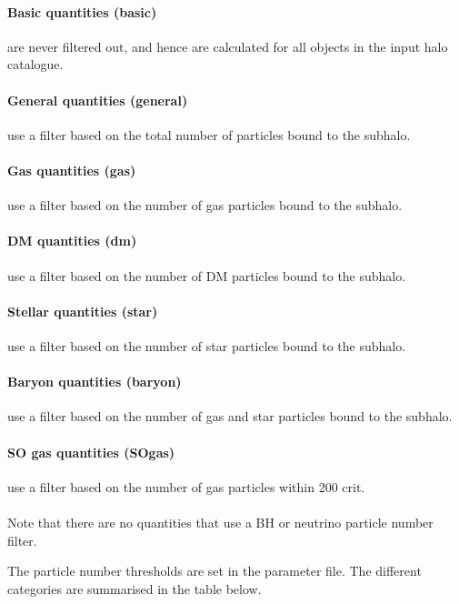 \documentclass{article}
\begin{document}
\paragraph{Basic quantities (basic)} are never filtered out, and hence are calculated for all objects in the
input halo catalogue.

\paragraph{General quantities (general)} use a filter based on the total number of particles bound to the 
subhalo.

\paragraph{Gas quantities (gas)} use a filter based on the number of gas particles bound to the subhalo. 

\paragraph{DM quantities (dm)} use a filter based on the number of DM particles bound to the subhalo.

\paragraph{Stellar quantities (star)} use a filter based on the number of star particles bound to the 
subhalo.

\paragraph{Baryon quantities (baryon)} use a filter based on the number of gas and star particles 
bound to the subhalo.

\paragraph{SO gas quantities (SOgas)} use a filter based on the number of gas particles within 200 crit.

\paragraph{}Note that there are no quantities that use a BH or neutrino particle number filter.

The particle number thresholds are set in the parameter file. The different categories are summarised in the table below.
\end{document}
